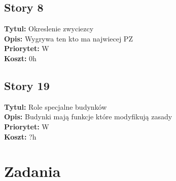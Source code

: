 \documentclass[12pt]{article}
\begin{document}
\subsection{Story 8}
\textbf{Tytul:} Okreslenie zwyciezcy \\
\textbf{Opis:} Wygrywa ten kto ma najwiecej PZ \\
\textbf{Priorytet:} W \\
\textbf{Koszt:} 0h \\

\subsection{Story 19}
\textbf{Tytul:} Role specjalne budynków \\
\textbf{Opis:} Budynki mają funkcje które modyfikują zasady \\
\textbf{Priorytet:} W \\
\textbf{Koszt:} ?h \\

\section{Zadania}
\end{document}

